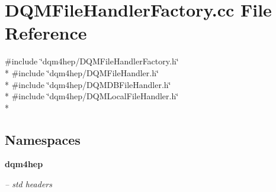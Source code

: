 \section{D\+Q\+M\+File\+Handler\+Factory.\+cc File Reference}
\label{DQMFileHandlerFactory_8cc}
{\ttfamily \#include \char`\"{}dqm4hep/\+D\+Q\+M\+File\+Handler\+Factory.\+h\char`\"{}}\\*
{\ttfamily \#include \char`\"{}dqm4hep/\+D\+Q\+M\+File\+Handler.\+h\char`\"{}}\\*
{\ttfamily \#include \char`\"{}dqm4hep/\+D\+Q\+M\+D\+B\+File\+Handler.\+h\char`\"{}}\\*
{\ttfamily \#include \char`\"{}dqm4hep/\+D\+Q\+M\+Local\+File\+Handler.\+h\char`\"{}}\\*
\subsection*{Namespaces}
\begin{DoxyCompactItemize}
\item 
 {\bf dqm4hep}
\begin{DoxyCompactList}\small\item\em -- std headers \end{DoxyCompactList}\end{DoxyCompactItemize}
